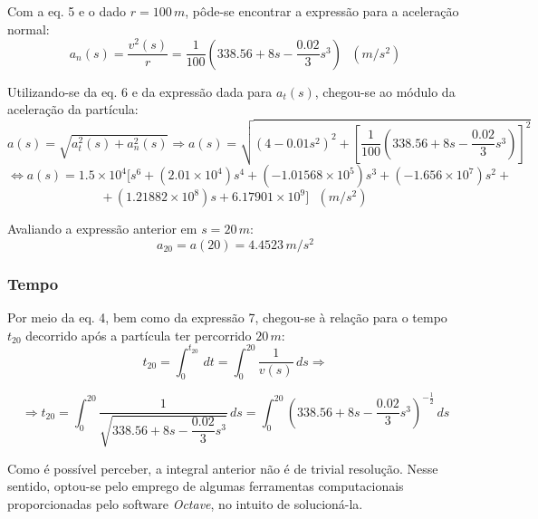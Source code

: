 \documentclass[a4paper, 12pt]{article}
\begin{document}
	Com a eq. 5 e o dado $r=100\,m$, pôde-se encontrar a expressão para a aceleração normal:
	\begin{equation}
		a_n(s)=\frac{v^2(s)}{r}=\frac{1}{100}\left(338.56+8s-\frac{0.02}{3}s^3\right)\,\,\,\,(m/s^2)
	\end{equation}
	
	Utilizando-se da eq. 6 e da expressão dada para $a_t(s)$, chegou-se ao módulo da aceleração da partícula:
	$$a(s)=\sqrt{a_t^2(s)+a_n^2(s)}\Longrightarrow a(s)= \sqrt{(4-0.01s^2)^2+
	\left[\frac{1}{100}\left(338.56+8s-\frac{0.02}{3}s^3\right)\right]^2}$$
	$$\Longleftrightarrow a(s)=1.5\times 10^4[s^6+(2.01\times 10^4)s^4+(-1.01568\times 10^5)s^3+(-1.656\times 10^7)s^2+$$
	$$+\,(1.21882\times 10^8)s+6.17901\times 10^9]\,\,\,\,(m/s^2)$$
	
	Avaliando a expressão anterior em $s=20\,m$: $$a_{20}=a(20)=4.4523\,m/s^2$$
	
	\subsubsection{Tempo}
	
	Por meio da eq. 4, bem como da expressão 7, chegou-se à relação para o tempo $t_{20}$ decorrido após a partícula ter
	percorrido $20\,m$: $$t_{20}=\int_{0}^{t_{20}}\,dt=\int_{0}^{20}\frac{1}{v(s)}\,ds\Longrightarrow$$
	
	\newpage
	
	$$\Longrightarrow t_{20}=\int_{0}^{20}\frac{1}{\sqrt{338.56+8s-\dfrac{0.02}{3}s^3}}\,ds=
	\int_{0}^{20}\left(338.56+8s-\frac{0.02}{3}s^3\right)^{-\frac{1}{2}}\,ds$$
	
	Como é possível perceber, a integral anterior não é de trivial resolução. Nesse sentido, optou-se pelo emprego de algumas
	ferramentas computacionais proporcionadas pelo software \textit{Octave}, no intuito de solucioná-la.
	
\end{document}
